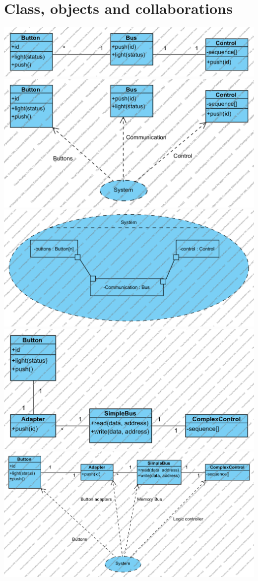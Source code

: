 \documentclass{article}
\begin{document}
\section{Class, objects and collaborations}
  \includegraphics[width=\linewidth]{../class1}
  \includegraphics[width=\linewidth]{../class2}
  \includegraphics[width=\linewidth]{../comp1}
  \includegraphics[width=\linewidth]{../class3}
  \includegraphics[width=\linewidth]{../class4}
\end{document}
